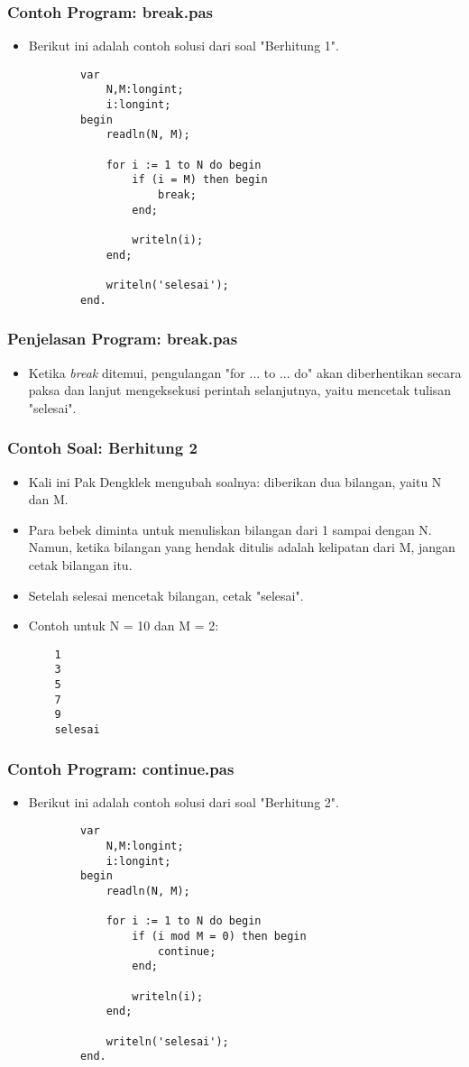 \documentclass{beamer}
\begin{document}
\begin{frame}[fragile]
\frametitle{Contoh Program: break.pas}
\begin{itemize}
	\item Berikut ini adalah contoh solusi dari soal "Berhitung 1".
	\begin{lstlisting}
		var
		    N,M:longint;
		    i:longint;
		begin
		    readln(N, M);
		
		    for i := 1 to N do begin
		        if (i = M) then begin
		            break;
		        end;
		
		        writeln(i);
		    end;
		    
		    writeln('selesai');
		end.
	\end{lstlisting}
\end{itemize}
\end{frame}

\begin{frame}
\frametitle{Penjelasan Program: break.pas}
\begin{itemize}
	\item Ketika \textit{break} ditemui, pengulangan "for ... to ... do" akan diberhentikan secara paksa dan lanjut mengeksekusi perintah selanjutnya, yaitu mencetak tulisan "selesai".
\end{itemize}
\end{frame}

\begin{frame}[fragile]
\frametitle{Contoh Soal: Berhitung 2}
\begin{itemize}
	\item Kali ini Pak Dengklek mengubah soalnya: diberikan dua bilangan, yaitu N dan M.
	\item Para bebek diminta untuk menuliskan bilangan dari 1 sampai dengan N. Namun, ketika bilangan yang hendak ditulis adalah \alert{kelipatan} dari M, jangan cetak bilangan itu.
	\item Setelah selesai mencetak bilangan, cetak "selesai".
	\item Contoh untuk N = 10 dan M = 2:
	\begin{lstlisting}
	1
	3
	5
	7
	9
	selesai
	\end{lstlisting}
\end{itemize}
\end{frame}

\begin{frame}[fragile]
\frametitle{Contoh Program: continue.pas}
\begin{itemize}
	\item Berikut ini adalah contoh solusi dari soal "Berhitung 2".
	\begin{lstlisting}
		var
		    N,M:longint;
		    i:longint;
		begin
		    readln(N, M);
		
		    for i := 1 to N do begin
		        if (i mod M = 0) then begin
		            continue;
		        end;
		
		        writeln(i);
		    end;
		    
		    writeln('selesai');
		end.
	\end{lstlisting}
\end{itemize}
\end{frame}
\end{document}
